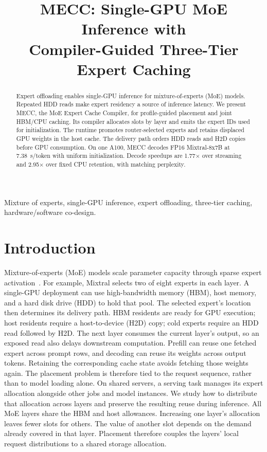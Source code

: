 \documentclass[conference,9pt,letterpaper]{IEEEtran}
\title{MECC: Single-GPU MoE Inference with\protect\\Compiler-Guided Three-Tier Expert Caching}
\author{}
\begin{document}
\maketitle\flushbottom
\begin{abstract}
Expert offloading enables single-GPU inference for mixture-of-experts (MoE) models. Repeated HDD reads make expert residency a source of inference latency. We present MECC, the MoE Expert Cache Compiler, for profile-guided placement and joint HBM/CPU caching. Its compiler allocates slots by layer and emits the expert IDs used for initialization. The runtime promotes router-selected experts and retains displaced GPU weights in the host cache. The delivery path orders HDD reads and H2D copies before GPU consumption. On one A100, MECC decodes FP16 Mixtral-8x7B at 7.38~s/token with uniform initialization. Decode speedups are 1.77$\times$ over streaming and 2.95$\times$ over fixed CPU retention, with matching perplexity.
\end{abstract}

\begin{IEEEkeywords}
Mixture of experts, single-GPU inference, expert offloading, three-tier caching, hardware/software co-design.
\end{IEEEkeywords}

\section{Introduction}
Mixture-of-experts (MoE) models scale parameter capacity through sparse expert activation~\cite{shazeer,switch,mixtral,deepseekmoe}. For example, Mixtral selects two of eight experts in each layer. A single-GPU deployment can use high-bandwidth memory (HBM), host memory, and a hard disk drive (HDD) to hold that pool. The selected expert's location then determines its delivery path. HBM residents are ready for GPU execution; host residents require a host-to-device (H2D) copy; cold experts require an HDD read followed by H2D. The next layer consumes the current layer's output, so an exposed read also delays downstream computation. Prefill can reuse one fetched expert across prompt rows, and decoding can reuse its weights across output tokens. Retaining the corresponding cache state avoids fetching those weights again. The placement problem is therefore tied to the request sequence, rather than to model loading alone. On shared servers, a serving task manages its expert allocation alongside other jobs and model instances. We study how to distribute that allocation across layers and preserve the resulting reuse during inference. All MoE layers share the HBM and host allowances. Increasing one layer's allocation leaves fewer slots for others. The value of another slot depends on the demand already covered in that layer. Placement therefore couples the layers' local request distributions to a shared storage allocation.
\end{document}
